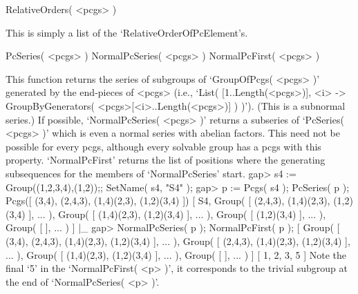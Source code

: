\>RelativeOrders( <pcgs> )

This is simply a list of the `RelativeOrderOfPcElement's.

\>PcSeries( <pcgs> )
\>NormalPcSeries( <pcgs> )
\>NormalPcFirst( <pcgs> )

This function returns the series of subgroups  of `GroupOfPcgs( <pcgs> )'
generated by the end-pieces of  <pcgs> (i.e., `List( [1..Length(<pcgs>)],
<i> -> GroupByGenerators( <pcgs>{[<i>..Length(<pcgs>)]} ) )'). (This is a
subnormal  series.) If possible,  `NormalPcSeries(  <pcgs>  )' returns  a
subseries of `PcSeries(  <pcgs>  )' which  is  even a normal series  with
abelian factors. This need not be possible for every pcgs, although every
solvable group has a pcgs with this property. `NormalPcFirst' returns the
list of positions where the  generating  subsequences for the members  of
`NormalPcSeries' start.
\beginexample
    gap> s4 := Group((1,2,3,4),(1,2));;  SetName( s4, "S4" );
    gap> p := Pcgs( s4 );  PcSeries( p );
    Pcgs([ (3,4), (2,4,3), (1,4)(2,3), (1,2)(3,4) ])
    [ S4, Group( [ (2,4,3), (1,4)(2,3), (1,2)(3,4) ], ... ), 
      Group( [ (1,4)(2,3), (1,2)(3,4) ], ... ), 
      Group( [ (1,2)(3,4) ], ... ), Group( [  ], ... ) ]
|_
    gap> NormalPcSeries( p );  NormalPcFirst( p );
    [ Group( [ (3,4), (2,4,3), (1,4)(2,3), (1,2)(3,4) ], ... ), 
      Group( [ (2,4,3), (1,4)(2,3), (1,2)(3,4) ], ... ), 
      Group( [ (1,4)(2,3), (1,2)(3,4) ], ... ), Group( [  ], ... ) ]
    [ 1, 2, 3, 5 ]
\endexample
Note the final `5' in the  `NormalPcFirst( <p> )',  it corresponds to the
trivial subgroup at the end of `NormalPcSeries( <p> )'.

\null

